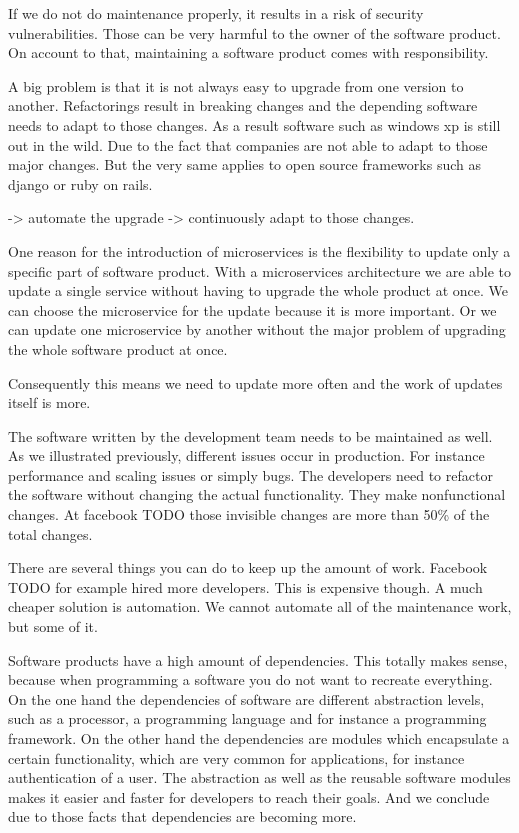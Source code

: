 If we do not do maintenance properly, it results in a risk of security
vulnerabilities. Those can be very harmful to the owner of the software product. On
account to that, maintaining a software product comes with responsibility.

A big problem is that it is not always easy to upgrade from one version to
another. Refactorings result in breaking changes and the depending software needs to adapt
to those changes. As a result software such as windows xp is still out in the wild. Due to
the fact that companies are not able to adapt to those major changes. But the very same
applies to open source frameworks such as django or ruby on rails.

-> automate the upgrade
-> continuously adapt to those changes.

One reason for the introduction of microservices is the flexibility to update only a
specific part of software product. With a microservices architecture we are able to update
a single service without having to upgrade the whole product at once. We can choose the
microservice for the update because it is more important. Or we can update one
microservice by another without the major problem of upgrading the whole software product
at once.

Consequently this means we need to update more often and the work of updates itself is
more.

The software written by the development team needs to be maintained as well. As we
illustrated previously, different issues occur in production. For instance performance and
scaling issues or simply bugs. The developers need to refactor the software without
changing the actual functionality. They make nonfunctional changes. At facebook TODO
those invisible changes are more than 50\% of the total changes.

There are several things you can do to keep up the amount of work. Facebook TODO for
example hired more developers. This is expensive though. A much cheaper solution is
automation. We cannot automate all of the maintenance work, but some of it.

Software products have a high amount of dependencies. This totally makes sense, because
when programming a software you do not want to recreate everything. On the one hand the
dependencies of software are different abstraction levels, such as a processor, a
programming language and for instance a programming framework. On the other hand the
dependencies are modules which encapsulate a certain functionality, which are very common
for applications, for instance authentication of a user. The abstraction as well as the
reusable software modules makes it easier and faster for developers to reach their
goals. And we conclude due to those facts that dependencies are becoming more.

